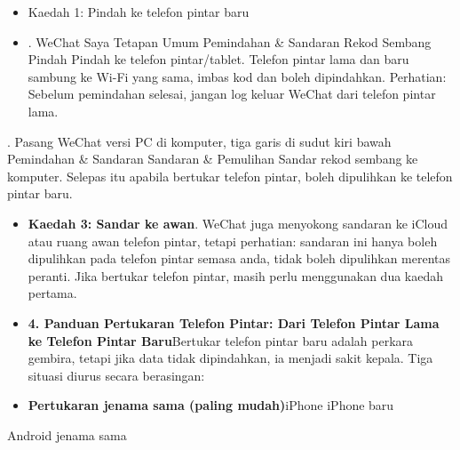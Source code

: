 \begin{itemize}
  \item Kaedah 1: Pindah ke telefon pintar baru
  \item . WeChat Saya Tetapan Umum Pemindahan \& Sandaran Rekod Sembang Pindah Pindah ke telefon pintar/tablet. Telefon pintar lama dan baru sambung ke Wi-Fi yang sama, imbas kod dan boleh dipindahkan. Perhatian: Sebelum pemindahan selesai, jangan log keluar WeChat dari telefon pintar lama.
\end{itemize}


. Pasang WeChat versi PC di komputer, tiga garis di sudut kiri bawah Pemindahan \& Sandaran Sandaran \& Pemulihan Sandar rekod sembang ke komputer. Selepas itu apabila bertukar telefon pintar, boleh dipulihkan ke telefon pintar baru.

\begin{itemize}
  \item \textbf{Kaedah 3: Sandar ke awan}. WeChat juga menyokong sandaran ke iCloud atau ruang awan telefon pintar, tetapi perhatian: sandaran ini hanya boleh dipulihkan pada telefon pintar semasa anda, tidak boleh dipulihkan merentas peranti. Jika bertukar telefon pintar, masih perlu menggunakan dua kaedah pertama.
  \item \textbf{4. Panduan Pertukaran Telefon Pintar: Dari Telefon Pintar Lama ke Telefon Pintar Baru}Bertukar telefon pintar baru adalah perkara gembira, tetapi jika data tidak dipindahkan, ia menjadi sakit kepala. Tiga situasi diurus secara berasingan:
  \item \textbf{Pertukaran jenama sama (paling mudah)}iPhone iPhone baru
\end{itemize}


Android jenama sama


